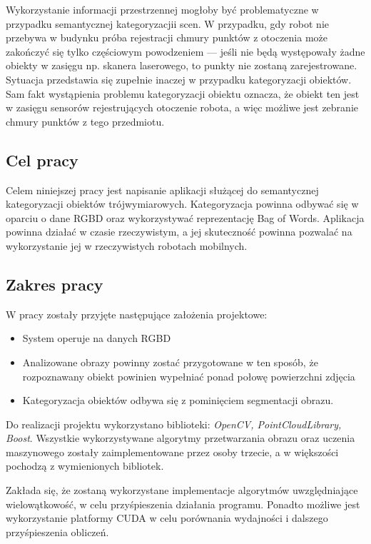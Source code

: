 \documentclass[a4paper,10pt]{article}
\begin{document}
  Wykorzystanie informacji przestrzennej mogłoby być problematyczne w przypadku semantycznej kategoryzacjii scen. W przypadku, gdy robot nie przebywa w budynku próba rejestracji chmury punktów z otoczenia może zakończyć się tylko częściowym powodzeniem --- jeśli nie będą występowały żadne obiekty w zasięgu np. skanera laserowego, to punkty nie zostaną zarejestrowane. Sytuacja przedstawia się zupełnie inaczej w przypadku kategoryzacji obiektów. Sam fakt wystąpienia problemu kategoryzacji obiektu oznacza, że obiekt ten jest w zasięgu sensorów rejestrujących otoczenie robota, a więc możliwe jest zebranie chmury punktów z tego przedmiotu.

\subsection{Cel pracy}

  Celem niniejszej pracy jest napisanie aplikacji służącej do semantycznej kategoryzacji obiektów trójwymiarowych. Kategoryzacja powinna odbywać się w oparciu o dane RGBD oraz wykorzystywać reprezentację Bag of Words. Aplikacja powinna działać w czasie rzeczywistym, a jej skuteczność powinna pozwalać na wykorzystanie jej w rzeczywistych robotach mobilnych.

\subsection{Zakres pracy}

  W pracy zostały przyjęte następujące założenia projektowe:
  \begin{itemize}
   \item System operuje na danych RGBD
   \item Analizowane obrazy powinny zostać przygotowane w ten sposób, że rozpoznawany obiekt powinien wypełniać ponad połowę powierzchni zdjęcia
   \item Kategoryzacja obiektów odbywa się z pominięciem segmentacji obrazu.
  \end{itemize}
  
  Do realizacji projektu wykorzystano biblioteki: \emph{OpenCV, PointCloudLibrary, Boost}. Wszystkie wykorzystywane algorytmy przetwarzania obrazu oraz uczenia maszynowego zostały zaimplementowane przez osoby trzecie, a w większości pochodzą z wymienionych bibliotek.
  
  Zakłada się, że zostaną wykorzystane implementacje algorytmów uwzględniające wielowątkowość, w celu przyśpieszenia działania programu. Ponadto możliwe jest wykorzystanie platformy CUDA w celu porównania wydajności i dalszego przyśpieszenia obliczeń.
 
\end{document}
